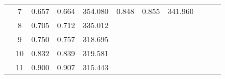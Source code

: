 \begin{table*}
\begin{tabular}{|c|ccc|c|cc|c|cc|c|c|}
\cline{2-8}    \rowcolor[rgb]{ .788,  .788,  .788}       & \multicolumn{1}{c|}{\cellcolor[rgb]{ 1,  1,  1}7} & \multicolumn{1}{c|}{\cellcolor[rgb]{ 1,  1,  1}0.657} & \cellcolor[rgb]{ 1,  1,  1}0.664 & \cellcolor[rgb]{ 1,  1,  1}354.080 & \multicolumn{1}{c|}{\cellcolor[rgb]{ 1,  1,  1}0.848} & \cellcolor[rgb]{ 1,  1,  1}0.855 & \cellcolor[rgb]{ 1,  1,  1}341.960 & \multicolumn{2}{c|}{\cellcolor[rgb]{ 0,  0,  0}} & \multicolumn{1}{c}{\cellcolor[rgb]{ 0,  0,  0}} & \multicolumn{1}{c}{\cellcolor[rgb]{ 1,  1,  1}} \bigstrut\\
\cline{2-7}    \rowcolor[rgb]{ .788,  .788,  .788}       & \multicolumn{1}{c|}{\cellcolor[rgb]{ 1,  1,  1}8} & \multicolumn{1}{c|}{\cellcolor[rgb]{ 1,  1,  1}0.705} & \cellcolor[rgb]{ 1,  1,  1}0.712 & \cellcolor[rgb]{ 1,  1,  1}335.012 & \multicolumn{2}{r|}{\multirow{4}[7]{*}{\cellcolor[rgb]{ 0,  0,  0}}} & \multirow{4}[7]{*}{\cellcolor[rgb]{ 0,  0,  0}} & \multicolumn{2}{c|}{\cellcolor[rgb]{ 0,  0,  0}} & \multicolumn{1}{c}{\cellcolor[rgb]{ 0,  0,  0}} & \multicolumn{1}{c}{\cellcolor[rgb]{ 1,  1,  1}} \bigstrut\\
\cline{2-5}    \rowcolor[rgb]{ .788,  .788,  .788}       & \multicolumn{1}{c|}{\cellcolor[rgb]{ 1,  1,  1}9} & \multicolumn{1}{c|}{\cellcolor[rgb]{ 1,  1,  1}0.750} & \cellcolor[rgb]{ 1,  1,  1}0.757 & \cellcolor[rgb]{ 1,  1,  1}318.695 & \multicolumn{2}{r|}{\cellcolor[rgb]{ 0,  0,  0}} & \cellcolor[rgb]{ 0,  0,  0} & \multicolumn{2}{c|}{\cellcolor[rgb]{ 0,  0,  0}} & \multicolumn{1}{c}{\cellcolor[rgb]{ 0,  0,  0}} & \multicolumn{1}{c}{\cellcolor[rgb]{ 1,  1,  1}} \bigstrut\\
\cline{2-5}    \rowcolor[rgb]{ .788,  .788,  .788}       & \multicolumn{1}{c|}{\cellcolor[rgb]{ 1,  1,  1}10} & \multicolumn{1}{c|}{\cellcolor[rgb]{ 1,  1,  1}0.832} & \cellcolor[rgb]{ 1,  1,  1}0.839 & \cellcolor[rgb]{ 1,  1,  1}319.581 & \multicolumn{2}{r|}{\cellcolor[rgb]{ 0,  0,  0}} & \cellcolor[rgb]{ 0,  0,  0} & \multicolumn{2}{c|}{\cellcolor[rgb]{ 0,  0,  0}} & \multicolumn{1}{c}{\cellcolor[rgb]{ 0,  0,  0}} & \multicolumn{1}{c}{\cellcolor[rgb]{ 1,  1,  1}} \bigstrut\\
\cline{2-5}    \rowcolor[rgb]{ .788,  .788,  .788}       & \multicolumn{1}{c|}{\cellcolor[rgb]{ 1,  1,  1}11} & \multicolumn{1}{c|}{\cellcolor[rgb]{ 1,  1,  1}0.900} & \cellcolor[rgb]{ 1,  1,  1}0.907 & \cellcolor[rgb]{ 1,  1,  1}315.443 & \multicolumn{2}{r|}{\cellcolor[rgb]{ 0,  0,  0}} & \cellcolor[rgb]{ 0,  0,  0} & \multicolumn{2}{c|}{\cellcolor[rgb]{ 0,  0,  0}} & \multicolumn{1}{c}{\cellcolor[rgb]{ 0,  0,  0}} & \multicolumn{1}{c}{\cellcolor[rgb]{ 1,  1,  1}} \bigstrut[t]\\

\end{tabular}
\end{table*}
